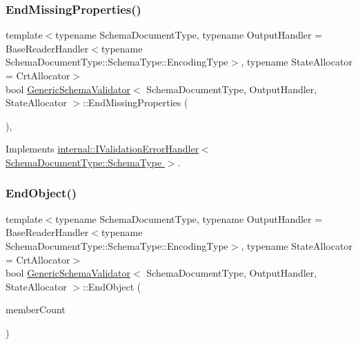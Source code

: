 \mbox{\label{classGenericSchemaValidator_a557b7aa531ff94a6355fed8f8575fed5}} 
\subsubsection{\texorpdfstring{End\+Missing\+Properties()}{EndMissingProperties()}}
{\footnotesize\ttfamily template$<$typename Schema\+Document\+Type, typename Output\+Handler = Base\+Reader\+Handler$<$typename Schema\+Document\+Type\+::\+Schema\+Type\+::\+Encoding\+Type$>$, typename State\+Allocator = Crt\+Allocator$>$ \\
bool \hyperlink{classGenericSchemaValidator}{Generic\+Schema\+Validator}$<$ Schema\+Document\+Type, Output\+Handler, State\+Allocator $>$\+::End\+Missing\+Properties (\begin{DoxyParamCaption}{ }\end{DoxyParamCaption})\hspace{0.3cm}{\ttfamily [inline]}, {\ttfamily [virtual]}}



Implements \hyperlink{classinternal_1_1IValidationErrorHandler_a3a01eec1a969cfb600340a2bad157c9c}{internal\+::\+I\+Validation\+Error\+Handler$<$ Schema\+Document\+Type\+::\+Schema\+Type $>$}.

\mbox{\label{classGenericSchemaValidator_aa89e14f0f731f6acdec22a0f7e003037}} 
\subsubsection{\texorpdfstring{End\+Object()}{EndObject()}}
{\footnotesize\ttfamily template$<$typename Schema\+Document\+Type, typename Output\+Handler = Base\+Reader\+Handler$<$typename Schema\+Document\+Type\+::\+Schema\+Type\+::\+Encoding\+Type$>$, typename State\+Allocator = Crt\+Allocator$>$ \\
bool \hyperlink{classGenericSchemaValidator}{Generic\+Schema\+Validator}$<$ Schema\+Document\+Type, Output\+Handler, State\+Allocator $>$\+::End\+Object (\begin{DoxyParamCaption}\item[{\hyperlink{rapidjson_8h_a5ed6e6e67250fadbd041127e6386dcb5}{Size\+Type}}]{member\+Count }\end{DoxyParamCaption})\hspace{0.3cm}{\ttfamily [inline]}}

